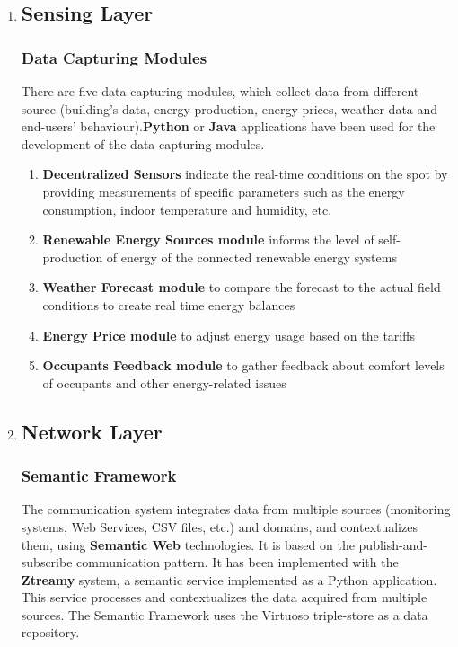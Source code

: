 \documentclass{report}
\begin{document}
\begin{enumerate}
    
    \item\subsection*{Sensing Layer} 
    \subsubsection{Data Capturing Modules}
    There are five data capturing modules, which collect data from different source (building’s data, energy production, energy prices, weather data and end-users’ behaviour).\textbf{Python} or \textbf{Java} applications have been used for the development of the data capturing modules.


    \begin{enumerate}
        \item \textbf{Decentralized Sensors} indicate the real-time conditions on the spot by providing measurements of
        specific parameters such as the energy consumption, indoor temperature and humidity, etc.
        \item \textbf{Renewable Energy Sources module} informs the level of self-production of energy of the connected renewable energy systems
        \item \textbf{Weather Forecast module} to compare the forecast to the actual field conditions to create real time energy balances
        \item \textbf{Energy Price module} to adjust energy usage based on the tariffs
        \item \textbf{Occupants Feedback module} to  gather feedback about comfort levels of occupants and other energy-related issues


    \end{enumerate}

    \item\subsection*{Network Layer}
    \subsubsection{Semantic Framework}
    The  communication system integrates data from multiple sources (monitoring systems, Web Services, CSV files, etc.) and domains, and contextualizes them, using \textbf{Semantic Web} technologies. It is based on the publish-and-subscribe communication pattern. It has been implemented with the \textbf{Ztreamy} system, a semantic service implemented as a Python application. This service processes and contextualizes the data acquired from multiple sources. The Semantic Framework uses the Virtuoso triple-store as a data repository.\\


\end{enumerate}
\end{document}
